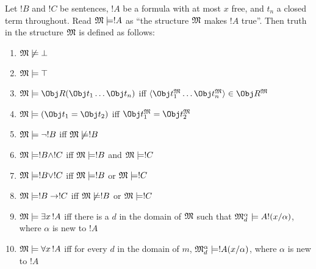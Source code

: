 \documentclass[syntax-and-semantics]{subfiles}
\begin{document}
\begin{defn}

Let $!B$ and $!C$ be sentences, $!A$ be a formula with at most $x$ free, and $t_n$ a closed term throughout. Read $\mathfrak{M} \models !A$ as ``the structure $\mathfrak{M}$ makes $!A$ true''.  Then truth in the structure $\mathfrak{M}$ is defined as follows:
\begin{enumerate}
\item $\mathfrak{M} \not\models \bot$
\item $\mathfrak{M} \models \top$
\item $\Struct{M} \Sat \Obj R(\Obj t_1 \ldots \Obj t_n)$ iff $\langle \Obj t_1^\Struct{M} \ldots \Obj t_n^\Struct{M} \rangle \in \Obj R^\Struct{M}$
\item $\Struct{M} \Sat (\Obj t_1 = \Obj t_2)$ iff $\Obj t_1^\Struct{M}=\Obj t_2^\Struct{M}$
\item $\mathfrak{M} \models \lnot !B$ iff $\mathfrak{M} \not\models !B$
\item $\mathfrak{M} \models !B \land !C$ iff $\mathfrak{M} \models !B$ and $\mathfrak{M} \models !C$
\item $\mathfrak{M} \models !B \lor !C$ iff $\mathfrak{M} \models !B$ or $\mathfrak{M} \models !C$
\item $\mathfrak{M} \models !B \to !C$ iff $\mathfrak{M} \not\models !B$ or $\mathfrak{M} \models !C$
\item $\Struct{M} \Sat \lexists[x][!A]$ iff there is a $d$ in the domain of $\mathfrak{M}$ such that $\mathfrak{M}^\alpha_d \models A!(x/\alpha)$, where $\alpha$ is new to $!A$
\item $\Struct{M} \Sat \lforall[x][!A]$ iff for every $d$ in the domain of $m$, $\mathfrak{M}^\alpha_d \models !A(x/\alpha)$, where $\alpha$ is new to $!A$
\end{enumerate}
\end{defn}

\end{document}
